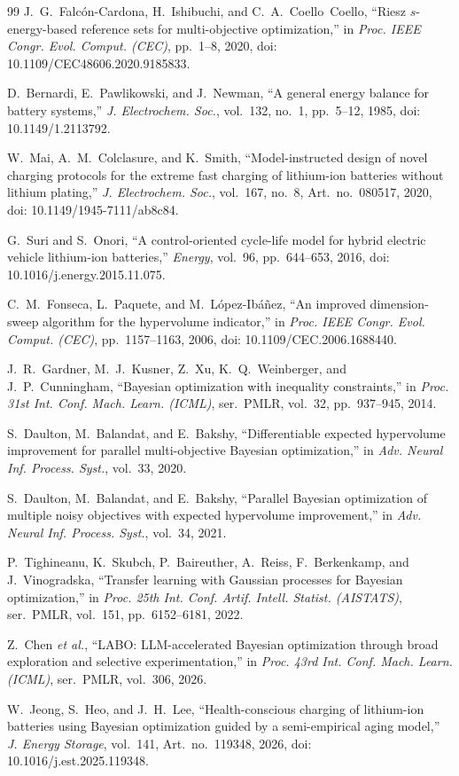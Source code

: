 \documentclass[journal]{IEEEtran}
\begin{document}
\begin{thebibliography}{99}
J.~G.~Falc\'on-Cardona, H.~Ishibuchi, and C.~A.~Coello~Coello,
``Riesz $s$-energy-based reference sets for multi-objective optimization,'' in
\textit{Proc. IEEE Congr. Evol. Comput. (CEC)}, pp.~1--8, 2020,
doi: 10.1109/CEC48606.2020.9185833.

D.~Bernardi, E.~Pawlikowski, and J.~Newman, ``A general energy balance for
battery systems,'' \textit{J. Electrochem. Soc.}, vol.~132, no.~1,
pp.~5--12, 1985, doi: 10.1149/1.2113792.

W.~Mai, A.~M.~Colclasure, and K.~Smith, ``Model-instructed design of novel
charging protocols for the extreme fast charging of lithium-ion batteries
without lithium plating,'' \textit{J. Electrochem. Soc.}, vol.~167, no.~8,
Art.~no.~080517, 2020, doi: 10.1149/1945-7111/ab8c84.

G.~Suri and S.~Onori, ``A control-oriented cycle-life model for hybrid
electric vehicle lithium-ion batteries,'' \textit{Energy}, vol.~96,
pp.~644--653, 2016, doi: 10.1016/j.energy.2015.11.075.

C.~M.~Fonseca, L.~Paquete, and M.~L\'opez-Ib\'a\~nez, ``An improved
dimension-sweep algorithm for the hypervolume indicator,'' in
\textit{Proc. IEEE Congr. Evol. Comput. (CEC)}, pp.~1157--1163, 2006,
doi: 10.1109/CEC.2006.1688440.

J.~R.~Gardner, M.~J.~Kusner, Z.~Xu, K.~Q.~Weinberger, and J.~P.~Cunningham,
``Bayesian optimization with inequality constraints,'' in
\textit{Proc. 31st Int. Conf. Mach. Learn. (ICML)}, ser.~PMLR, vol.~32,
pp.~937--945, 2014.

S.~Daulton, M.~Balandat, and E.~Bakshy, ``Differentiable expected hypervolume
improvement for parallel multi-objective Bayesian optimization,'' in
\textit{Adv. Neural Inf. Process. Syst.}, vol.~33, 2020.

S.~Daulton, M.~Balandat, and E.~Bakshy, ``Parallel Bayesian optimization of
multiple noisy objectives with expected hypervolume improvement,'' in
\textit{Adv. Neural Inf. Process. Syst.}, vol.~34, 2021.

P.~Tighineanu, K.~Skubch, P.~Baireuther, A.~Reiss, F.~Berkenkamp, and
J.~Vinogradska, ``Transfer learning with Gaussian processes for Bayesian
optimization,'' in \textit{Proc. 25th Int. Conf. Artif. Intell. Statist.
(AISTATS)}, ser.~PMLR, vol.~151, pp.~6152--6181, 2022.

Z.~Chen \textit{et al.}, ``LABO: LLM-accelerated Bayesian optimization through
broad exploration and selective experimentation,'' in \textit{Proc. 43rd Int.
Conf. Mach. Learn. (ICML)}, ser.~PMLR, vol.~306, 2026.

W.~Jeong, S.~Heo, and J.~H.~Lee, ``Health-conscious charging of lithium-ion
batteries using Bayesian optimization guided by a semi-empirical aging
model,'' \textit{J. Energy Storage}, vol.~141, Art.~no.~119348, 2026,
doi: 10.1016/j.est.2025.119348.

\end{thebibliography}
\end{document}

